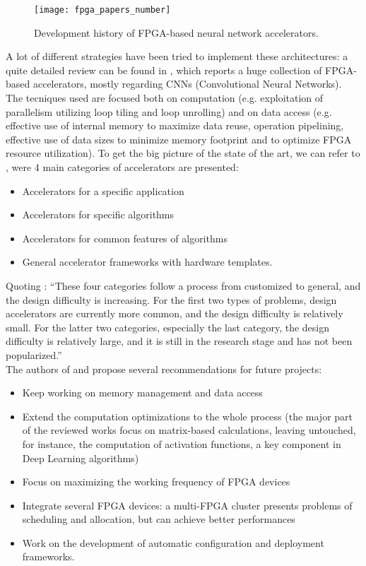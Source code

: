 \documentclass[11pt,a4paper]{article}
\begin{document}
\begin{figure}[h]
	\centering	
	\texttt{[image: fpga\_papers\_number]}
	\caption{Development history of FPGA-based neural network accelerators.}
	\label{fig:fpga_papers_number}
\end{figure}

A lot of different strategies have been tried to implement these architectures: a quite detailed review can be found in \cite{shawahna_review_2019}, which reports a huge collection of FPGA-based accelerators, mostly regarding CNNs (Convolutional Neural Networks). The tecniques used are focused both on computation (e.g. exploitation of parallelism utilizing loop tiling and loop unrolling) and on data access (e.g. effective use of internal memory to maximize data reuse, operation pipelining, effective use of data sizes to minimize memory footprint and to optimize FPGA resource utilization). To get the big picture of the state of the art, we can refer to \cite{wang_survey_2018}, were 4 main categories of accelerators are presented:
\begin{itemize}
	\item Accelerators for a specific application
	\item Accelerators for specific algorithms
	\item Accelerators for common features of algorithms
	\item General accelerator frameworks with hardware templates.
\end{itemize}
Quoting \cite{wang_survey_2018}: ``These four categories follow a process from customized to general, and the design difficulty is increasing. For the first two types of problems, design accelerators are currently more common, and the design difficulty is relatively small. For the latter two categories, especially the last category, the design difficulty is relatively large, and it is still in the research stage and has not been
popularized.''\\
The authors of \cite{wang_survey_2018} and \cite{shawahna_review_2019} propose several recommendations for future projects:
\begin{itemize}
	\item Keep working on memory management and data access
	\item Extend the computation optimizations to the whole process (the major part of the reviewed works focus on matrix-based calculations, leaving untouched, for instance, the computation of activation functions, a key component in Deep Learning algorithms)
	\item Focus on maximizing the working frequency of FPGA devices
	\item Integrate several FPGA devices: a multi-FPGA cluster presents problems of scheduling and allocation, but can achieve better performances
	\item Work on the development of automatic configuration and deployment frameworks.
\end{itemize}
\end{document}
